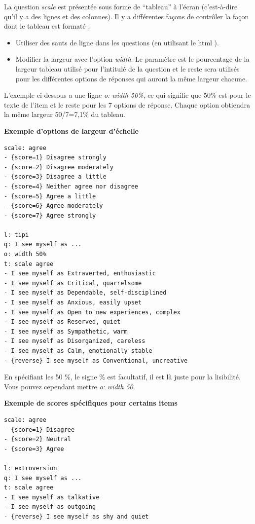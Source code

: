 \documentclass[
]{book}
\providecommand{\tightlist}{%
  \setlength{\itemsep}{0pt}\setlength{\parskip}{0pt}}
\begin{document}
La question \emph{scale} est présentée sous forme de ``tableau'' à l'écran (c'est-à-dire qu'il y a des lignes et des colonnes). Il y a différentes façons de contrôler la façon dont le tableau est formaté :

\begin{itemize}
\tightlist
\item
  Utiliser des sauts de ligne dans les questions (en utilisant le html ).
\item
  Modifier la largeur avec l'option \emph{width}. Le paramètre est le pourcentage de la largeur tableau utilisé pour l'intitulé de la question et le reste sera utilisés pour les différentes options de réponses qui auront la même largeur chacune.
\end{itemize}

L'exemple ci-dessous a une ligne \emph{o: width 50\%}, ce qui signifie que 50\% est pour le texte de l'item et le reste pour les 7 options de réponse. Chaque option obtiendra la même largeur 50/7=7,1\% du tableau.

\textbf{Exemple d'options de largeur d'échelle}

\begin{verbatim}
scale: agree
- {score=1} Disagree strongly
- {score=2} Disagree moderately
- {score=3} Disagree a little
- {score=4} Neither agree nor disagree
- {score=5} Agree a little
- {score=6} Agree moderately
- {score=7} Agree strongly

l: tipi
q: I see myself as ...
o: width 50%
t: scale agree
- I see myself as Extraverted, enthusiastic
- I see myself as Critical, quarrelsome
- I see myself as Dependable, self-disciplined
- I see myself as Anxious, easily upset
- I see myself as Open to new experiences, complex
- I see myself as Reserved, quiet
- I see myself as Sympathetic, warm
- I see myself as Disorganized, careless
- I see myself as Calm, emotionally stable
- {reverse} I see myself as Conventional, uncreative
\end{verbatim}

En spécifiant les 50 \%, le signe \% est facultatif, il est là juste pour la lisibilité. Vous pouvez cependant mettre \emph{o: width 50}.

\textbf{Exemple de scores spécifiques pour certains items}

\begin{verbatim}
scale: agree
- {score=1} Disagree
- {score=2} Neutral
- {score=3} Agree

l: extroversion
q: I see myself as ...
t: scale agree
- I see myself as talkative
- I see myself as outgoing
- {reverse} I see myself as shy and quiet
\end{verbatim}
\end{document}
